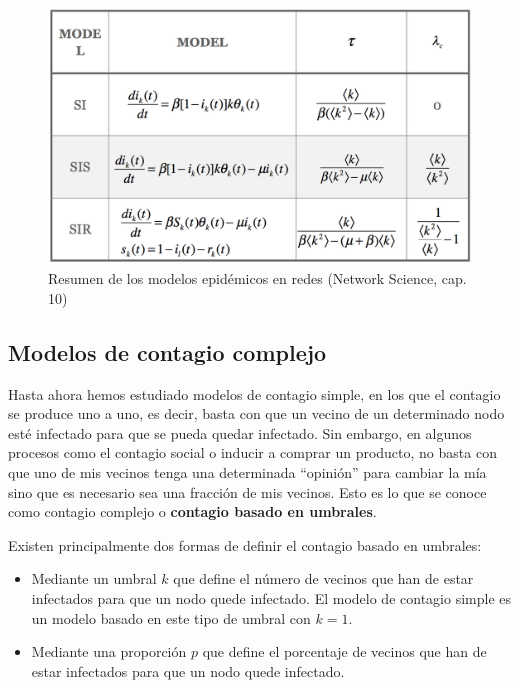 \documentclass[]{article}
\begin{document}
\begin{figure}[htbp]
\centering
\includegraphics{../images/tema08/resumenModelosRedes.png}
\caption{Resumen de los modelos epidémicos en redes (Network Science,
cap. 10)}
\end{figure}

\subsection{Modelos de contagio
complejo}\label{modelos-de-contagio-complejo}

Hasta ahora hemos estudiado modelos de contagio simple, en los que el
contagio se produce uno a uno, es decir, basta con que un vecino de un
determinado nodo esté infectado para que se pueda quedar infectado. Sin
embargo, en algunos procesos como el contagio social o inducir a comprar
un producto, no basta con que uno de mis vecinos tenga una determinada
``opinión'' para cambiar la mía sino que es necesario sea una fracción
de mis vecinos. Esto es lo que se conoce como contagio complejo o
\textbf{contagio basado en umbrales}.

Existen principalmente dos formas de definir el contagio basado en
umbrales:

\begin{itemize}
\itemsep1pt\parskip0pt
\item
  Mediante un umbral \(k\) que define el número de vecinos que han de
  estar infectados para que un nodo quede infectado. El modelo de
  contagio simple es un modelo basado en este tipo de umbral con
  \(k=1\).
\item
  Mediante una proporción \(p\) que define el porcentaje de vecinos que
  han de estar infectados para que un nodo quede infectado.
\end{itemize}
\end{document}

